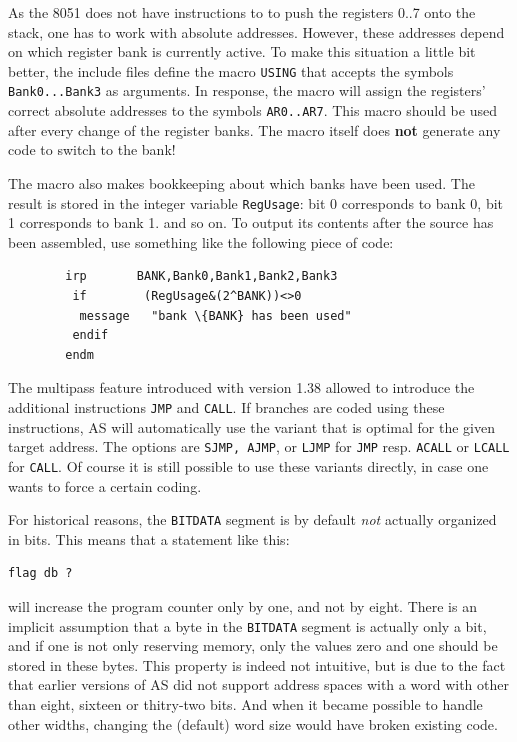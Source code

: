 \documentclass[12pt,twoside]{report}
\newcommand{\bb}[1]{{\bf #1}}
\newcommand{\tty}[1]{{\tt #1}}
\newcommand{\asname}{{AS}}
\begin{document}
As the 8051 does not have instructions to to push the registers 0..7
onto the stack, one has to work with absolute addresses.  However,
these addresses depend on which register bank is currently active.
To make this situation a little bit better, the include files define
the macro \tty{USING} that accepts the symbols \tty{Bank0...Bank3} as arguments.
In response, the macro will assign the registers' correct absolute
addresses to the symbols \tty{AR0..AR7}.  This macro should be used after
every change of the register banks.  The macro itself does \bb{not}
generate any code to switch to the bank!

The macro also makes bookkeeping about which banks have been used.
The result is stored in the integer variable \tty{RegUsage}: bit 0
corresponds to bank 0, bit 1 corresponds to bank 1. and so on.  To
output its contents after the source has been assembled, use
something like the following piece of code:
\begin{verbatim}
        irp       BANK,Bank0,Bank1,Bank2,Bank3
         if        (RegUsage&(2^BANK))<>0
          message   "bank \{BANK} has been used"
         endif
        endm
\end{verbatim}
The multipass feature introduced with version 1.38 allowed to introduce
the additional instructions \tty{JMP} and \tty{CALL}.  If branches are
coded using these instructions, \asname{} will automatically use the variant that
is optimal for the given target address.  The options are \tty{SJMP,
AJMP}, or \tty{LJMP} for \tty{JMP} resp. \tty{ACALL} or \tty{LCALL} for
\tty{CALL}.  Of course it is still possible to use these variants
directly, in case one wants to force a certain coding.

For historical reasons, the {\tt BITDATA} segment is by default {\em not}
actually organized in bits.  This means that a statement like this:
\begin{verbatim}
flag db ?
\end{verbatim}
will increase the program counter only by one, and not by eight.  There is
an implicit assumption that a byte in the {\tt BITDATA} segment is actually
only a bit, and if one is not only reserving memory, only the values zero and
one should be stored in these bytes.  This property is indeed not intuitive,
but is due to the fact that earlier versions of \asname{} did not support
address spaces with a word with other than eight, sixteen or thitry-two bits.
And when it became possible to handle other widths, changing the (default)
word size would have broken existing code.
\end{document}
